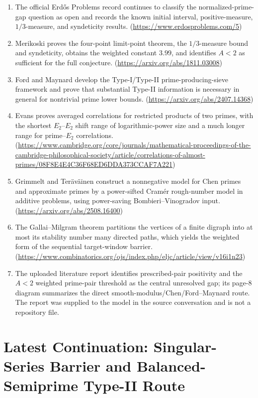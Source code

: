 \begin{enumerate}
\item The official Erdős Problems record continues to classify the normalized-prime-gap question as open and records the known initial interval, positive-measure, \(1/3\)-measure, and syndeticity results. (\url{https://www.erdosproblems.com/5})
\item Merikoski proves the four-point limit-point theorem, the \(1/3\)-measure bound and syndeticity, obtains the weighted constant \(3.99\), and identifies \(A<2\) as sufficient for the full conjecture. (\url{https://arxiv.org/abs/1811.03008})
\item Ford and Maynard develop the Type-I/Type-II prime-producing-sieve framework and prove that substantial Type-II information is necessary in general for nontrivial prime lower bounds. (\url{https://arxiv.org/abs/2407.14368})
\item Evans proves averaged correlations for restricted products of two primes, with the shortest \(E_2\)--\(E_2\) shift range of logarithmic-power size and a much longer range for prime--\(E_2\) correlations. (\url{https://www.cambridge.org/core/journals/mathematical-proceedings-of-the-cambridge-philosophical-society/article/correlations-of-almost-primes/08F8E4E4C36F68ED6DDA373CCAF7A221})
\item Grimmelt and Teräväinen construct a nonnegative model for Chen primes and approximate primes by a power-sifted Cramér rough-number model in additive problems, using power-saving Bombieri--Vinogradov input. (\url{https://arxiv.org/abs/2508.16400})
\item The Gallai--Milgram theorem partitions the vertices of a finite digraph into at most its stability number many directed paths, which yields the weighted form of the sequential target-window barrier. (\url{https://www.combinatorics.org/ojs/index.php/eljc/article/view/v16i1n23})
\item The uploaded literature report identifies prescribed-pair positivity and the \(A<2\) weighted prime-pair threshold as the central unresolved gap; its page-8 diagram summarizes the direct smooth-modulus/Chen/Ford--Maynard route. The report was supplied to the model in the source conversation and is not a repository file.
\end{enumerate}

\medskip
\medskip

\section*{Latest Continuation: Singular-Series Barrier and Balanced-Semiprime Type-II Route}


